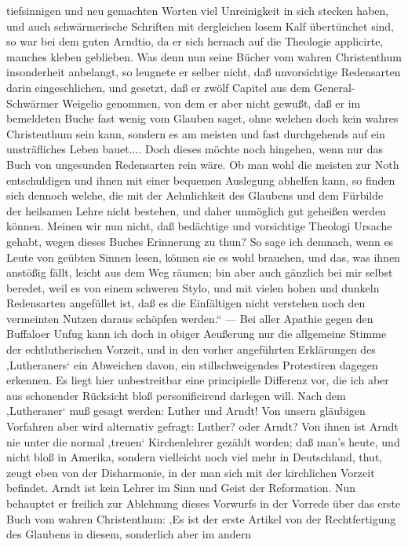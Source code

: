 tiefsinnigen und neu gemachten Worten viel Unreinigkeit in sich stecken haben, und auch schwärmerische
Schriften mit dergleichen losem Kalf übertünchet sind, so war bei dem guten Arndtio, da er sich
hernach auf die Theologie applicirte, manches kleben geblieben. Was denn nun seine Bücher vom wahren
Christenthum insonderheit anbelangt, so leugnete er selber nicht, daß unvorsichtige Redensarten darin
eingeschlichen, und gesetzt, daß er zwölf Capitel aus dem General-Schwärmer Weigelio genommen, von dem
er aber nicht gewußt, daß er im bemeldeten Buche fast wenig vom Glauben saget, ohne welchen doch kein
wahres Christenthum sein kann, sondern es am meisten und fast durchgehends auf ein unsträfliches Leben
bauet.... Doch dieses möchte noch hingehen, wenn nur das Buch von ungesunden Redensarten rein wäre. Ob
man wohl die meisten zur Noth entschuldigen und ihnen mit einer bequemen Auslegung abhelfen kann, so
finden sich dennoch welche, die mit der Aehnlichkeit des Glaubens und dem Fürbilde der heilsamen Lehre
nicht bestehen, und daher unmöglich gut geheißen werden können. Meinen wir nun nicht, daß bedächtige
und vorsichtige Theologi Ursache gehabt, wegen dieses Buches Erinnerung zu thun? So sage ich demnach,
wenn es Leute von geübten Sinnen lesen, können sie es wohl brauchen, und das, was ihnen anstößig
fällt, leicht aus dem Weg räumen; bin aber auch gänzlich bei mir selbst beredet, weil es von einem
schweren Stylo, und mit vielen hohen und dunkeln Redensarten angefüllet ist, daß es die Einfältigen
nicht verstehen noch den vermeinten Nutzen daraus schöpfen werden.“ — Bei aller Apathie gegen
den Buffaloer Unfug kann ich doch in obiger Aeußerung nur die allgemeine Stimme der echtlutherischen
Vorzeit, und in den vorher angeführten Erklärungen des ‚Lutheraners‘ ein Abweichen davon, ein
stillschweigendes Protestiren dagegen erkennen. Es liegt hier unbestreitbar eine principielle Differenz
vor, die ich aber aus schonender Rücksicht bloß personificirend darlegen will. Nach dem ‚Lutheraner‘
muß gesagt werden: Luther und Arndt! Von unsern gläubigen Vorfahren aber wird alternativ gefragt:
Luther? oder Arndt? Von ihnen ist Arndt nie unter die normal ,treuen‘ Kirchenlehrer gezählt worden;
daß man’s heute, und nicht bloß in Amerika, sondern vielleicht noch viel mehr in Deutschland, thut,
zeugt eben von der Disharmonie, in der man sich mit der kirchlichen Vorzeit befindet. Arndt ist kein
Lehrer im Sinn und Geist der Reformation. Nun behauptet er freilich zur Ablehnung
dieses Vorwurfs in der Vorrede über das erste Buch vom wahren Christenthum:
‚Es ist der erste Artikel von der Rechtfertigung des Glaubens in diesem, sonderlich aber im andern
